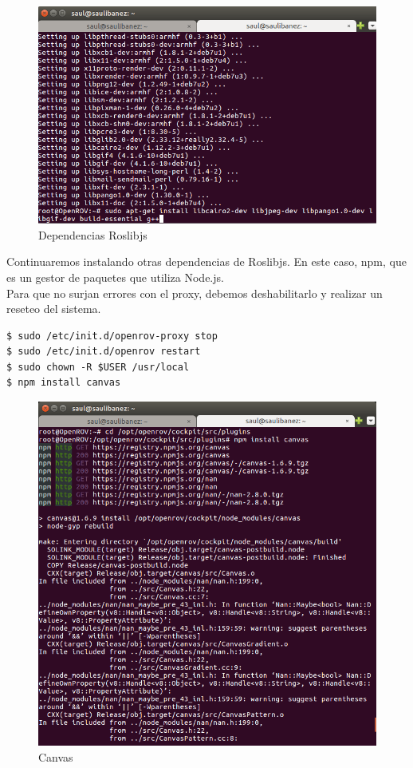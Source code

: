 \begin{figure} [hbtp]
  \begin{center}
    \includegraphics[width=12cm]{img/cap4/dependencias_roslibjs}
  \end{center}
  \caption{Dependencias Roslibjs}
  \label{fig:Dependencias Roslibjs}
\end{figure}
\newpage
Continuaremos instalando otras dependencias de Roslibjs. En este caso, npm, que es un gestor de paquetes que utiliza Node.js.
\\Para que no surjan errores con el proxy, debemos deshabilitarlo y realizar un reseteo del sistema. 
\renewcommand{\lstlistingname}{}
\begin{lstlisting}[caption=Dependencias Roslibjs, label={lst:roslibjs}]
$ sudo /etc/init.d/openrov-proxy stop
$ sudo /etc/init.d/openrov restart
$ sudo chown -R $USER /usr/local 
$ npm install canvas 
\end{lstlisting}

\newpage
\begin{figure} [hbtp]
  \begin{center}
    \includegraphics[width=12cm]{img/cap4/canvas}
  \end{center}
  \caption{Canvas}
  \label{fig:canvas}
\end{figure}

